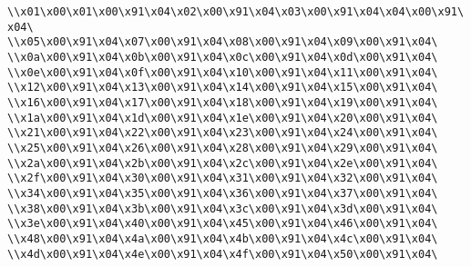 \verb|\\x01\x00\x01\x00\x91\x04\x02\x00\x91\x04\x03\x00\x91\x04\x04\x00\x91\x04\|\newline
\verb|\\x05\x00\x91\x04\x07\x00\x91\x04\x08\x00\x91\x04\x09\x00\x91\x04\|\newline
\verb|\\x0a\x00\x91\x04\x0b\x00\x91\x04\x0c\x00\x91\x04\x0d\x00\x91\x04\|\newline
\verb|\\x0e\x00\x91\x04\x0f\x00\x91\x04\x10\x00\x91\x04\x11\x00\x91\x04\|\newline
\verb|\\x12\x00\x91\x04\x13\x00\x91\x04\x14\x00\x91\x04\x15\x00\x91\x04\|\newline
\verb|\\x16\x00\x91\x04\x17\x00\x91\x04\x18\x00\x91\x04\x19\x00\x91\x04\|\newline
\verb|\\x1a\x00\x91\x04\x1d\x00\x91\x04\x1e\x00\x91\x04\x20\x00\x91\x04\|\newline
\verb|\\x21\x00\x91\x04\x22\x00\x91\x04\x23\x00\x91\x04\x24\x00\x91\x04\|\newline
\verb|\\x25\x00\x91\x04\x26\x00\x91\x04\x28\x00\x91\x04\x29\x00\x91\x04\|\newline
\verb|\\x2a\x00\x91\x04\x2b\x00\x91\x04\x2c\x00\x91\x04\x2e\x00\x91\x04\|\newline
\verb|\\x2f\x00\x91\x04\x30\x00\x91\x04\x31\x00\x91\x04\x32\x00\x91\x04\|\newline
\verb|\\x34\x00\x91\x04\x35\x00\x91\x04\x36\x00\x91\x04\x37\x00\x91\x04\|\newline
\verb|\\x38\x00\x91\x04\x3b\x00\x91\x04\x3c\x00\x91\x04\x3d\x00\x91\x04\|\newline
\verb|\\x3e\x00\x91\x04\x40\x00\x91\x04\x45\x00\x91\x04\x46\x00\x91\x04\|\newline
\verb|\\x48\x00\x91\x04\x4a\x00\x91\x04\x4b\x00\x91\x04\x4c\x00\x91\x04\|\newline
\verb|\\x4d\x00\x91\x04\x4e\x00\x91\x04\x4f\x00\x91\x04\x50\x00\x91\x04\|\newline
